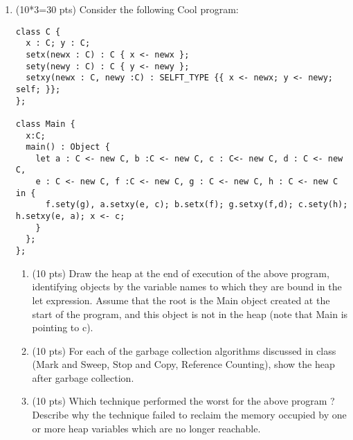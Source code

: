 \documentclass[10pt]{article}
\begin{document}
\begin{enumerate}
\item (10*3=30 pts) Consider the following Cool program:

\begin{verbatim}
class C {
  x : C; y : C;
  setx(newx : C) : C { x <- newx };
  sety(newy : C) : C { y <- newy };
  setxy(newx : C, newy :C) : SELFT_TYPE {{ x <- newx; y <- newy; self; }};
};

class Main {
  x:C;
  main() : Object {
    let a : C <- new C, b :C <- new C, c : C<- new C, d : C <- new C,
    e : C <- new C, f :C <- new C, g : C <- new C, h : C <- new C in {
      f.sety(g), a.setxy(e, c); b.setx(f); g.setxy(f,d); c.sety(h); h.setxy(e, a); x <- c;
    }
  };
};
\end{verbatim}
\begin{enumerate}
  \item (10 pts) Draw the heap at the end of execution of the above program, identifying objects by the variable names to which they are bound in the let expression. Assume that the root is the Main object created at the start of the program, and this object is not in the heap (note that Main is pointing to c).
%
  \item (10 pts) For each of the garbage collection algorithms discussed in class (Mark and Sweep, Stop and Copy,
Reference Counting), show the heap after garbage collection.
%
  \item (10 pts) Which technique performed the worst for the above program ? Describe why the technique failed to
reclaim the memory occupied by one or more heap variables which are no longer reachable.
\end{enumerate}
\end{enumerate}
\end{document}
